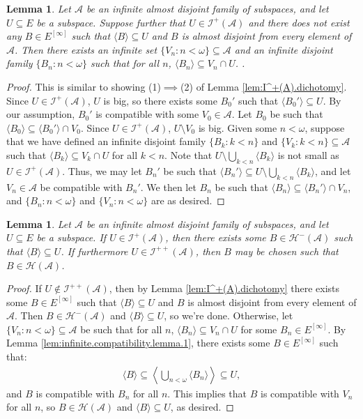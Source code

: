 \documentclass[10pt,a4paper]{amsart}
\theoremstyle{plain}
\numberwithin{equation}{section}
\newtheorem{lemma}[theorem]{Lemma}
\theoremstyle{definition}
\renewcommand{\c}[1]{\langle #1 \rangle}
\newcommand{\cal}{\mathcal}
\newcommand{\A}{\cal{A}}
\renewcommand{\H}{\cal{H}}
\newcommand{\I}{\cal{I}}
\begin{document}
\begin{lemma}
\label{lem:infinite.compatibility.lemma.2}
    Let $\A$ be an infinite almost disjoint family of subspaces, and let $U \subseteq E$ be a subspace. Suppose further that $U \in \I^+(\A)$ and there does not exist any $B \in E^{[\infty]}$ such that $\c{B} \subseteq U$ and $B$ is almost disjoint from every element of $\A$. Then there exists an infinite set $\{V_n : n < \omega\} \subseteq \A$ and an infinite disjoint family $\{B_n : n < \omega\}$ such that for all $n$, $\c{B_n} \subseteq V_n \cap U$. .
\end{lemma}

\begin{proof}
    This is similar to showing (1)$\implies$(2) of Lemma \ref{lem:I^+(A).dichotomy}. Since $U \in \I^+(\A)$, $U$ is big, so there exists some $B_0'$ such that $\c{B_0'} \subseteq U$. By our assumption, $B_0'$ is compatible with some $V_0 \in \A$. Let $B_0$ be such that $\c{B_0} \subseteq \c{B_0'} \cap V_0$. Since $U \in \I^+(\A)$, $U \setminus V_0$ is big. Given some $n < \omega$, suppose that we have defined an infinite disjoint family $\{B_k : k < n\}$ and $\{V_k : k < n\} \subseteq \A$ such that $\c{B_k} \subseteq V_k \cap U$ for all $k < n$. Note that $U \setminus \bigcup_{k<n} \c{B_k}$ is not small as $U \in \I^+(\A)$. Thus, we may let $B_n'$ be such that $\c{B_n'} \subseteq U \setminus \bigcup_{k<n} \c{B_k}$, and let $V_n \in \A$ be compatible with $B_n'$. We then let $B_n$ be such that $\c{B_n} \subseteq \c{B_n'} \cap V_n$, and $\{B_n : n < \omega\}$ and $\{V_n : n <\omega\}$ are as desired.
\end{proof}

\begin{lemma}
\label{lem:block.refinement.lemma}
    Let $\A$ be an infinite almost disjoint family of subspaces, and let $U \subseteq E$ be a subspace. If $U \in \I^+(\A)$, then there exists some $B \in \H^-(\A)$ such that $\c{B} \subseteq U$. If furthermore $U \in \I^{++}(\A)$, then $B$ may be chosen such that $B \in \H(\A)$.
\end{lemma}

\begin{proof}
    If $U \notin \I^{++}(\A)$, then by Lemma \ref{lem:I^+(A).dichotomy} there exists some $B \in E^{[\infty]}$ such that $\c{B} \subseteq U$ and $B$ is almost disjoint from every element of $\A$. Then $B \in \H^-(\A)$ and $\c{B} \subseteq U$, so we're done. Otherwise, let $\{V_n : n < \omega\} \subseteq \A$ be such that for all $n$, $\c{B_n} \subseteq V_n \cap U$ for some $B_n \in E^{[\infty]}$. By Lemma \ref{lem:infinite.compatibility.lemma.1}, there exists some $B \in E^{[\infty]}$ such that:
    \begin{align*}
        \c{B} \subseteq \left\langle\bigcup_{n<\omega}\c{B_n}\right\rangle \subseteq U,
    \end{align*}
    and $B$ is compatible with $B_n$ for all $n$. This implies that $B$ is compatible with $V_n$ for all $n$, so $B \in \H(\A)$ and $\c{B} \subseteq U$, as desired.
\end{proof}
\end{document}
